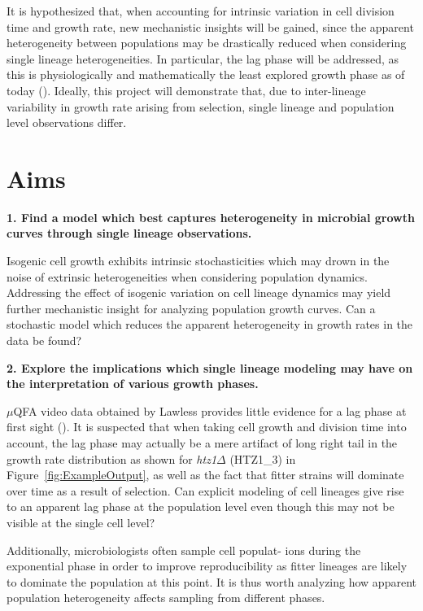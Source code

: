 \documentclass{bioinfo}
\begin{document}
It is hypothesized that, when accounting for intrinsic variation in cell division time and growth rate, new mechanistic insights will be gained, since the apparent heterogeneity between populations may be drastically reduced when considering single lineage heterogeneities. In particular, the lag phase will be addressed, as this is physiologically and mathematically the least explored growth phase as of today (\citealp{Rolfe12}). Ideally, this project will demonstrate that, due to inter-lineage variability in growth rate arising from selection, single lineage and population level observations differ. 

\section{Aims}

\textbf{1. Find a model which best captures heterogeneity in microbial growth curves through single lineage observations.}
\begin{addmargin}[1.5em]{1.5em}
Isogenic cell growth exhibits intrinsic stochasticities which may drown in the noise of extrinsic heterogeneities when considering population dynamics. Addressing the effect of isogenic variation on cell lineage dynamics may yield further mechanistic insight for analyzing population growth curves. Can a stochastic model which reduces the apparent heterogeneity in growth rates in the data be found?
\end{addmargin}

\textbf{2. Explore the implications which single lineage modeling may have on the interpretation of various growth phases.} 
\begin{addmargin}[1.5em]{1.5em}
$\mu$QFA video data obtained by Lawless provides little evidence for a lag phase at first sight (\citealp{Lawless13}). It is suspected that when taking cell growth and division time into account, the lag phase may actually be a mere artifact of long right tail in the growth rate distribution as shown for \textit{htz1}$\Delta$ (HTZ1\_3) in Figure~\ref{fig:ExampleOutput}, as  well as the fact that fitter strains will dominate over time as a result of selection. Can explicit modeling of cell lineages give rise to an apparent lag phase at the population level even though this may not be visible at the single cell level? 

Additionally, microbiologists often sample cell populat- ions during the exponential phase in order to improve reproducibility as fitter lineages are likely to dominate the population at this point. It is thus worth analyzing how apparent population heterogeneity affects sampling from different phases.
\end{addmargin}
\end{document}
